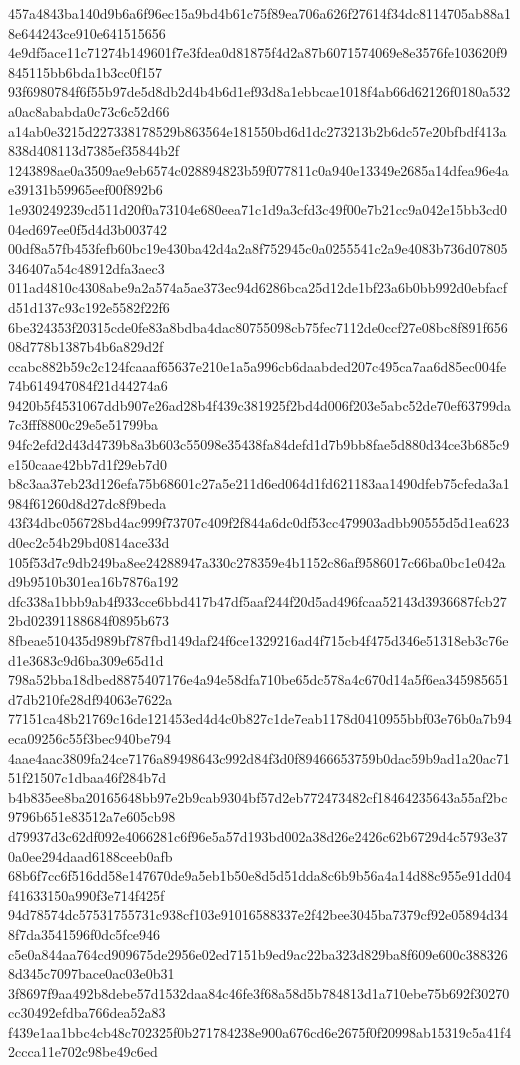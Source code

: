 {457a4843ba140d9b6a6f96ec15a9bd4b61c75f89ea706a626f27614f34dc8114705ab88a18e644243ce910e641515656
4e9df5ace11c71274b149601f7e3fdea0d81875f4d2a87b6071574069e8e3576fe103620f9845115bb6bda1b3cc0f157
93f6980784f6f55b97de5d8db2d4b4b6d1ef93d8a1ebbcae1018f4ab66d62126f0180a532a0ac8ababda0c73c6c52d66
a14ab0e3215d227338178529b863564e181550bd6d1dc273213b2b6dc57e20bfbdf413a838d408113d7385ef35844b2f
1243898ae0a3509ae9eb6574c028894823b59f077811c0a940e13349e2685a14dfea96e4ae39131b59965eef00f892b6
1e930249239cd511d20f0a73104e680eea71c1d9a3cfd3c49f00e7b21cc9a042e15bb3cd004ed697ee0f5d4d3b003742
00df8a57fb453fefb60bc19e430ba42d4a2a8f752945c0a0255541c2a9e4083b736d07805346407a54c48912dfa3aec3
011ad4810c4308abe9a2a574a5ae373ec94d6286bca25d12de1bf23a6b0bb992d0ebfacfd51d137c93c192e5582f22f6
6be324353f20315cde0fe83a8bdba4dac80755098cb75fec7112de0ccf27e08bc8f891f65608d778b1387b4b6a829d2f
ccabc882b59c2c124fcaaaf65637e210e1a5a996cb6daabded207c495ca7aa6d85ec004fe74b614947084f21d44274a6
9420b5f4531067ddb907e26ad28b4f439c381925f2bd4d006f203e5abc52de70ef63799da7c3fff8800c29e5e51799ba
94fc2efd2d43d4739b8a3b603c55098e35438fa84defd1d7b9bb8fae5d880d34ce3b685c9e150caae42bb7d1f29eb7d0
b8c3aa37eb23d126efa75b68601c27a5e211d6ed064d1fd621183aa1490dfeb75cfeda3a1984f61260d8d27dc8f9beda
43f34dbc056728bd4ac999f73707c409f2f844a6dc0df53cc479903adbb90555d5d1ea623d0ec2c54b29bd0814ace33d
105f53d7c9db249ba8ee24288947a330c278359e4b1152c86af9586017c66ba0bc1e042ad9b9510b301ea16b7876a192
dfc338a1bbb9ab4f933cce6bbd417b47df5aaf244f20d5ad496fcaa52143d3936687fcb272bd02391188684f0895b673
8fbeae510435d989bf787fbd149daf24f6ce1329216ad4f715cb4f475d346e51318eb3c76ed1e3683c9d6ba309e65d1d
798a52bba18dbed8875407176e4a94e58dfa710be65dc578a4c670d14a5f6ea345985651d7db210fe28df94063e7622a
77151ca48b21769c16de121453ed4d4c0b827c1de7eab1178d0410955bbf03e76b0a7b94eca09256c55f3bec940be794
4aae4aac3809fa24ce7176a89498643c992d84f3d0f89466653759b0dac59b9ad1a20ac7151f21507c1dbaa46f284b7d
b4b835ee8ba20165648bb97e2b9cab9304bf57d2eb772473482cf18464235643a55af2bc9796b651e83512a7e605cb98
d79937d3c62df092e4066281c6f96e5a57d193bd002a38d26e2426c62b6729d4c5793e370a0ee294daad6188ceeb0afb
68b6f7cc6f516dd58e147670de9a5eb1b50e8d5d51dda8c6b9b56a4a14d88c955e91dd04f41633150a990f3e714f425f
94d78574dc57531755731c938cf103e91016588337e2f42bee3045ba7379cf92e05894d348f7da3541596f0dc5fce946
c5e0a844aa764cd909675de2956e02ed7151b9ed9ac22ba323d829ba8f609e600c3883268d345c7097bace0ac03e0b31
3f8697f9aa492b8debe57d1532daa84c46fe3f68a58d5b784813d1a710ebe75b692f30270cc30492efdba766dea52a83
f439e1aa1bbc4cb48c702325f0b271784238e900a676cd6e2675f0f20998ab15319c5a41f42ccca11e702c98be49c6ed
}
